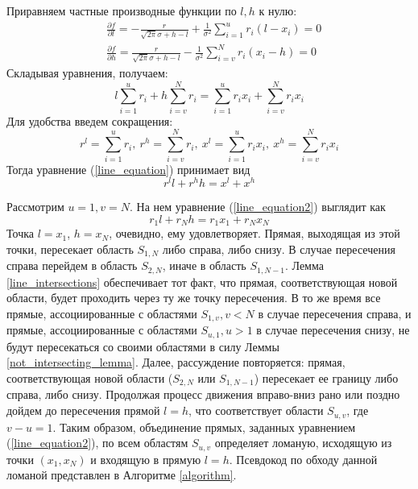 \documentclass[12pt]{article}
\theoremstyle{definition}
\theoremstyle{plain}
\begin{document}
Приравняем частные производные функции по $l, h$ к нулю:
\begin{align*}
&\frac{\partial f}{\partial l} = - \frac{r}{\sqrt{2 \pi} \sigma + h - l} +
\frac{1}{\sigma^2} \sum_{i = 1}^u r_i (l - x_i) = 0 \\
& \frac{\partial f}{\partial h} = \frac{r}{\sqrt{2 \pi} \sigma + h - l} -
\frac{1}{\sigma^2} \sum_{i = v}^N r_i (x_i - h) = 0
\end{align*}
Складывая уравнения, получаем:
\begin{equation}
\label{line_equation}
l \sum_{i = 1}^u r_i + h \sum_{i = v}^N r_i =
\sum_{i = 1}^u r_i x_i + \sum_{i = v}^N r_i x_i
\end{equation}
Для удобства введем сокращения:
$$
r^l = \sum_{i = 1}^u r_i,~
r^h = \sum_{i = v}^N r_i,~
x^l = \sum_{i = 1}^u r_i x_i,~
x^h = \sum_{i = v}^N r_i x_i
$$
Тогда уравнение (\ref{line_equation}) принимает вид
\begin{equation}
\label{line_equation2}
r^l l + r^h h = x^l + x^h
\end{equation}

Рассмотрим $u = 1, v = N$. На нем уравнение (\ref{line_equation2}) выглядит как
$$
r_1 l + r_N h = r_1 x_1 + r_N x_N
$$
Точка $l = x_1$, $h = x_N$, очевидно, ему удовлетворяет.
Прямая, выходящая из этой точки, пересекает область 
$S_{1, N}$ либо справа, либо снизу. В случае пересечения справа 
перейдем в область $S_{2, N}$, иначе в область $S_{1, N-1}$.
Лемма \ref{line_intersections} обеспечивает тот факт, 
что прямая, соответствующая новой области, будет проходить
через ту же точку пересечения. В то же время все прямые, ассоциированные с областями 
$S_{1, v}, v < N$ в случае пересечения справа, и прямые, ассоциированные
с областями $S_{u, 1}, u > 1$ в случае пересечения снизу, не будут пересекаться 
со своими областями в силу Леммы \ref{not_intersecting_lemma}. 
Далее, рассуждение повторяется: прямая, соответствующая 
новой области ($S_{2, N}$ или $S_{1, N-1}$) пересекает ее 
границу либо справа, либо снизу. Продолжая процесс движения вправо-вниз 
рано или поздно дойдем до пересечения прямой $l = h$, что соответствует области
$S_{u, v}$, где $v - u = 1$. Таким образом, объединение прямых, 
заданных уравнением (\ref{line_equation2}), по всем областям $S_{u, v}$
определяет ломаную, исходящую из точки $(x_1, x_N)$ и входящую в прямую $l = h$. 
Псевдокод по обходу данной ломаной представлен в Алгоритме \ref{algorithm}.
\end{document}
